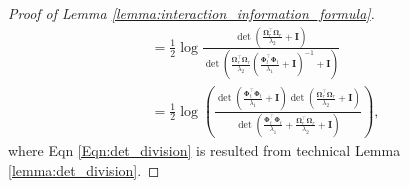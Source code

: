 \begin{proof}[Proof of Lemma \ref{lemma:interaction_information_formula}]
\begin{align}
        & = \frac{1}{2}\log \frac{\det (\frac{\boldsymbol{\Omega}_r^\top\boldsymbol{\Omega}_r}{\lambda_2} + \mathbf{I})}{\det\left(\frac{\boldsymbol{\Omega}_r^\top \boldsymbol{\Omega}_r}{\lambda_2} \left(\frac{\boldsymbol{\Phi}_t^\top\boldsymbol{\Phi}_t}{\lambda_1} +\mathbf{I}\right)^{-1} + \mathbf{I}\right)}
        \\ 
        & = \frac{1}{2}  \log \left(\frac{\det(\frac{\boldsymbol{\Phi}_t^\top \boldsymbol{\Phi}_t}{\lambda_1} + \mathbf{I})\det(\frac{\boldsymbol{\Omega}_r^\top \boldsymbol{\Omega}_r}{\lambda_2} + \mathbf{I})}{\det(\frac{\boldsymbol{\Phi}_t^\top \boldsymbol{\Phi}_t}{\lambda_1} + \frac{\boldsymbol{\Omega}_r^\top \boldsymbol{\Omega}_r}{\lambda_2} + \mathbf{I})} \right), 
\end{align}
where Eqn \ref{Eqn:det_division} is resulted from technical Lemma \ref{lemma:det_division}. 
\end{proof}


